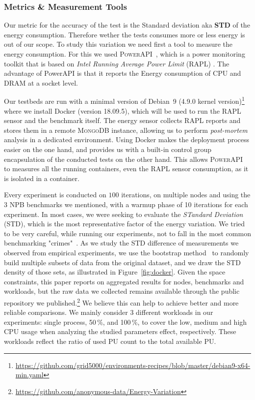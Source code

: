 \subsubsection{Metrics \& Measurement Tools}
Our metric for the accuracy of the test is the Standard deviation aka \textbf{STD} of the energy consumption. Therefore wether the tests consumes more or less energy is out of our scope.
To study this variation we need first a tool to measure the energy consumption. For this we used \textsc{PowerAPI}~\cite{DBLP:journals/jss/ColmantRKSFS18}, which is a power monitoring toolkit that is based on \emph{Intel Running Average Power Limit} (RAPL) \cite{Khan:2018:RAE:3199681.3177754}. The advantage of PowerAPI is that it reports the Energy consumption of CPU and DRAM at a socket level.

Our testbeds are run with a minimal version of Debian \,9 (4.9.0 kernel version)\footnote{\url{https://github.com/grid5000/environments-recipes/blob/master/debian9-x64-min.yaml}} where we install Docker (version 18.09.5), which will be used to run the RAPL sensor and the benchmark itself.
The energy sensor collects RAPL reports and stores them in a remote \textsc{MongoDB} instance, allowing us to perform \emph{post-mortem} analysis in a dedicated environment.
Using Docker makes the deployment process easier on the one hand, and provides us with a built-in control group encapsulation of the conducted tests on the other hand.
This allows \textsc{PowerAPI} to measures all the running containers, even the RAPL sensor consumption, as it is isolated in a container.

Every experiment is conducted on $100$ iterations, on multiple nodes and using the 3 NPB benchmarks we mentioned, with a warmup phase of 10 iterations for each experiment.
In most cases, we were seeking to evaluate the \emph{STandard Deviation} (STD), which is the most representative factor of the energy variation.
We tried to be very careful, while running our experiments, not to fall in the most common benchmarking "crimes"~\cite{DBLP:journals/corr/abs-1801-02381}.
As we study the STD difference of measurements we observed from empirical experiments, we use the bootstrap method~\cite{efron2000bootstrap} to randomly build multiple subsets of data from the original dataset, and we draw the STD density of those sets, as illustrated in Figure~\ref{fig:docker}.
Given the space constraints, this paper reports on aggregated results for nodes, benchmarks and workloads, but the raw data we collected remains available through the public repository we published.\footnote{\url{https://github.com/anonymous-data/Energy-Variation}}
We believe this can help to achieve better and more reliable comparisons.
We mainly consider 3 different workloads in our experiments: \textsf{single process}, 50\,\%, and 100\,\%, to cover the low, medium and high CPU usage when analyzing the studied parameters effect, respectively.
These workloads reflect the ratio of used PU count to the total available PU.


